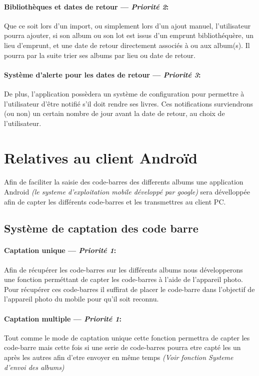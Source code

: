 \paragraph{Bibliothèques et dates de retour ---  \textit{Priorité 2}:}
Que ce soit lors d'un import, ou simplement lors d'un ajout manuel, l'utilisateur pourra ajouter, si son album ou son lot est issus d'un emprunt bibliothéquère, un lieu d'emprunt, et une date de retour directement associés à ou aux album(s). Il pourra par la suite trier ses albums par lieu ou date de retour.
\paragraph{Système d'alerte pour les dates de retour ---  \textit{Priorité 3}:}  
De plus, l'application possèdera un système de configuration pour permettre à l'utilisateur d'être notifié s'il doit rendre ses livres. Ces notifications surviendrons (ou non) un certain nombre de jour avant la date de retour, au choix de l'utilisateur.



\section{Relatives au client Androïd} 


\paragraph{}
Afin de faciliter la saisie des code-barres des differents albums une application Android \textit{(le systeme d'exploitation mobile développé par google)} sera dévelloppée afin de capter les différents code-barres et les transmettres au client PC.

\subsection{Système de captation des code barre}
\paragraph{Captation unique ---  \textit{Priorité 1}:}
Afin de récupérer les code-barres sur les différents albums nous développerons une fonction perméttant de capter les code-barres à l'aide de l'appareil photo.
Pour récupérer ces code-barres il suffirat de placer le code-barre dans l'objectif de l'appareil photo du mobile pour qu'il soit reconnu.

\paragraph{Captation multiple ---  \textit{Priorité 1}:}
Tout comme le mode de captation unique cette fonction permettra de capter les code-barre mais cette fois si une serie de code-barres pourra etre capté les un après les autres afin d'etre envoyer en même temps \textit{(Voir fonction Systeme d'envoi des albums)}

